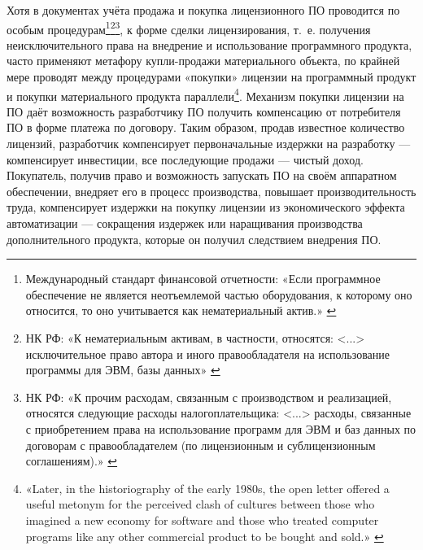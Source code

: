 \documentclass{article}
\begin{document}
Хотя в документах учёта продажа и покупка лицензионного ПО проводится по особым процедурам\footnote{Международный стандарт финансовой отчетности: «Если программное обеспечение не является неотъемлемой частью оборудования, к которому оно относится, то оно учитывается как нематериальный актив.» \cite{accountingIAS}}\footnote{НК РФ: «К нематериальным активам, в частности, относятся: <...> исключительное право автора и иного правообладателя на использование программы для ЭВМ, базы данных» \cite{accountingNKRF257}}\footnote{НК РФ: «К прочим расходам, связанным с производством и реализацией, относятся следующие расходы налогоплательщика: <...> расходы, связанные с приобретением права на использование программ для ЭВМ и баз данных по договорам с правообладателем (по лицензионным и сублицензионным соглашениям).» \cite{accountingNKRF264}}, к форме сделки лицензирования, т.~е. получения неисключительного права на внедрение и использование программного продукта, часто применяют метафору купли-продажи материального объекта, по крайней мере проводят между процедурами «покупки» лицензии на программный продукт и покупки материального продукта параллели\footnote{«Later, in the historiography of the early 1980s, the open letter offered a useful metonym for the perceived clash of cultures between those who imagined a new economy for software and those who treated computer programs like any other commercial product to be bought and sold.» \cite{driscollOpenLetter}}. Механизм покупки лицензии на ПО даёт возможность разработчику ПО получить компенсацию от потребителя ПО в форме платежа по договору. Таким образом, продав известное количество лицензий, разработчик компенсирует первоначальные издержки на разработку — компенсирует инвестиции, все последующие продажи — чистый доход. Покупатель, получив право и возможность запускать ПО на своём аппаратном обеспечении, внедряет его в процесс производства, повышает производительность труда, компенсирует издержки на покупку лицензии из экономического эффекта автоматизации — сокращения издержек или наращивания производства дополнительного продукта, которые он получил следствием внедрения ПО.
\end{document}
